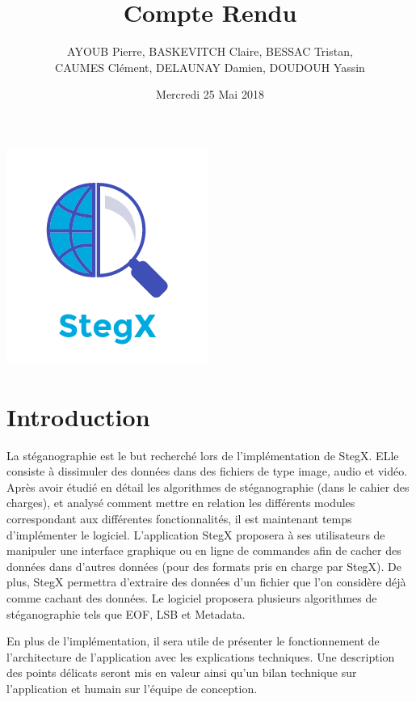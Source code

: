 \documentclass[11pt]{article}
\title{\huge{\textbf Compte Rendu}}
\author{AYOUB Pierre, BASKEVITCH Claire, BESSAC Tristan, \\
CAUMES Clément, DELAUNAY Damien, DOUDOUH Yassin}
\date{Mercredi 25 Mai 2018}
\begin{document}
\maketitle
\vspace{20em}
\begin{center}\includegraphics{pictures/Application.png}\end{center}
\newpage

\tableofcontents

\newpage

\section{Introduction}

La stéganographie est le but recherché lors de l'implémentation de StegX. 
ELle consiste à dissimuler des données dans des fichiers de type image, 
audio et vidéo. 
Après avoir étudié en détail les algorithmes de stéganographie (dans le 
cahier des charges), et analysé comment mettre en relation les différents 
modules correspondant aux différentes fonctionnalités, il est maintenant 
temps d'implémenter le logiciel.
L'application StegX proposera à ses utilisateurs de manipuler une interface 
graphique ou en ligne de commandes afin de cacher des données dans d'autres 
données (pour des formats pris en charge par StegX). De plus, StegX permettra 
d'extraire des données d'un fichier que l'on considère déjà comme cachant 
des données. Le logiciel proposera plusieurs algorithmes de stéganographie
tels que EOF, LSB et Metadata. 

En plus de l'implémentation, il sera utile de présenter le fonctionnement 
de l'architecture de l'application avec les explications techniques. 
Une description des points délicats seront mis en valeur ainsi qu'un 
bilan technique sur l'application et humain sur l'équipe de conception. 
\end{document}
